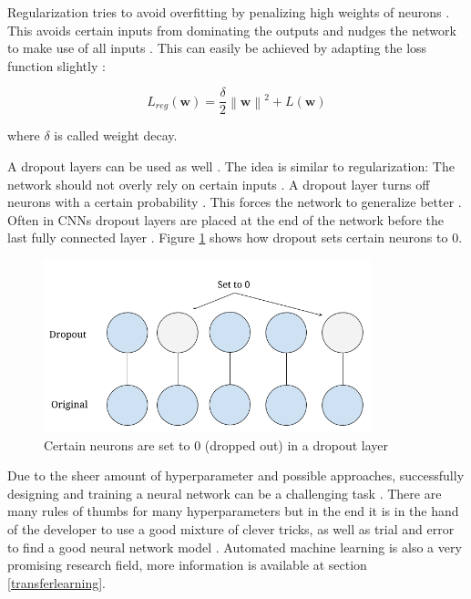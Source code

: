 \documentclass[draft,final,oneside]{vutinfth} %
\newcommand{\norm}[1]{\left\lVert#1\right\rVert}
\begin{document}
Regularization tries to avoid overfitting by penalizing	high weights of neurons \cite{aimodern}. This avoids certain inputs from dominating the outputs and nudges the network to make use of all inputs \cite{dlvc}. This can easily be achieved by adapting the loss function slightly \cite{bishop}\cite{dlvc}:

\begin{equation}
L_{reg}(\boldsymbol{w}) = \dfrac{\delta}{2}\norm{\boldsymbol{w}}^2 + L(\boldsymbol{w})
\end{equation}

where $\delta$ is called weight decay.

A dropout layers can be used as well \cite{Goodfellow-et-al-2016}. The idea is similar to regularization: The network should not overly rely on certain inputs \cite{Goodfellow-et-al-2016}. A dropout layer turns off neurons with a certain probability \cite{dlvc}. This forces the network to generalize better \cite{Goodfellow-et-al-2016}. Often in CNNs dropout layers are placed at the end of the network before the last fully connected layer \cite{Goodfellow-et-al-2016}. Figure \ref{fig:dropout} shows how dropout sets certain neurons to 0.

\begin{figure}[ht]
	\centering
  	\includegraphics[width=0.85\textwidth]{graphics/dropout.png}
	\caption{Certain neurons are set to 0 (dropped out) in a dropout layer \cite{Goodfellow-et-al-2016}}
	\label{fig:dropout}
\end{figure}

Due to the sheer amount of hyperparameter and possible approaches, successfully designing and training a neural network can be a challenging task \cite{anintroductiontoneuralnetworks}. There are many rules of thumbs for many hyperparameters but in the end it is in the hand of the developer to use a good mixture of clever tricks, as well as trial and error to find a good neural network model \cite{Goodfellow-et-al-2016}. Automated machine learning is also a very promising research field, more information is available at section \ref{transferlearning}.
\end{document}
